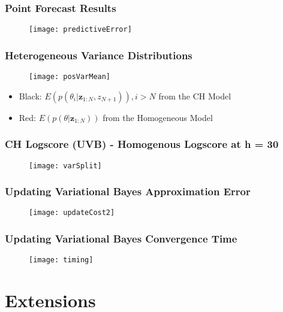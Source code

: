\documentclass[11pt]{beamer}\usepackage[]{graphicx}\usepackage[]{color}
\begin{document}
\begin{frame}
\frametitle{Point Forecast Results}
\begin{figure}
\centering
\texttt{[image: predictiveError]}
\end{figure}
\end{frame}


\begin{frame}
\frametitle{Heterogeneous Variance Distributions}
\begin{figure}
\centering
\texttt{[image: posVarMean]}
\end{figure}
\begin{itemize}
\item Black: $E(p(\theta_i | \textbf{z}_{1:N}, z_{N+1})), i > N$ from the CH Model
\item Red: $E(p(\theta | \textbf{z}_{1:N}))$ from the Homogeneous Model
\end{itemize}
\end{frame}

\begin{frame}
\frametitle{CH Logscore (UVB) - Homogenous Logscore at h = 30}
\begin{figure}
\centering
\texttt{[image: varSplit]}
\end{figure}
\end{frame}

\begin{frame}
\frametitle{Updating Variational Bayes Approximation Error}
\begin{figure}
\centering
\texttt{[image: updateCost2]}
\end{figure}
\end{frame}

\begin{frame}
\frametitle{Updating Variational Bayes Convergence Time}
\begin{figure}
\centering
\texttt{[image: timing]}
\end{figure}
\end{frame}

\section{Extensions}
\end{document}
